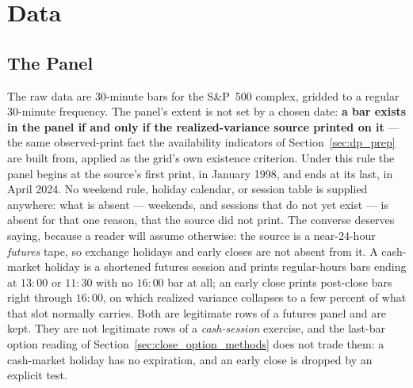 \section{Data}
\label{sec:data_prep}


\subsection{The Panel}
\label{sec:dp_data}

The raw data are 30-minute bars for the S\&P~500 complex, gridded to a
regular 30-minute frequency. The panel's extent is not set by a chosen
date: \textbf{a bar exists in the panel if and only if the
realized-variance source printed on it} --- the same observed-print fact
the availability indicators of Section~\ref{sec:dp_prep} are built from,
applied as the grid's own existence criterion. Under this rule the panel
begins at the source's first print, in January 1998, and ends at its last,
in April 2024. No weekend rule, holiday calendar, or session table is
supplied anywhere: what is absent --- weekends, and sessions that do not
yet exist --- is absent for that one reason, that the source did not print.
The converse deserves saying, because a reader will assume otherwise: the
source is a near-24-hour \emph{futures} tape, so exchange holidays and
early closes are not absent from it. A cash-market holiday is a shortened
futures session and prints regular-hours bars ending at $13{:}00$ or
$11{:}30$ with no $16{:}00$ bar at all; an early close prints post-close
bars right through $16{:}00$, on which realized variance collapses to a few
percent of what that slot normally carries. Both are legitimate rows of a
futures panel and are kept.
They are not legitimate rows of a
\emph{cash-session} exercise, and the last-bar option reading of
Section~\ref{sec:close_option_methods} does not trade them: a cash-market
holiday has no expiration, and an early close is dropped by an explicit test.

